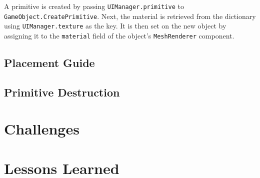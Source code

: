 \documentclass[a4paper, 12pt]{scrartcl}
\begin{document}
A primitive is created by passing \texttt{UIManager.primitive} to \texttt{GameObject.CreatePrimitive}. Next, the material is retrieved from the dictionary using \texttt{UIManager.texture} as the key. It is then set on the new object by assigning it to the \texttt{material} field of the object's \texttt{MeshRenderer} component.

\subsection{Placement Guide}

\subsection{Primitive Destruction}

\section{Challenges}

\section{Lessons Learned}
\end{document}

